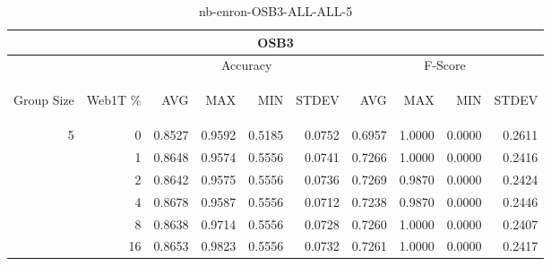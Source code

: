 \begin{center}
\begin{table}[htbp] 
 \begin{center}
\begin{tabular}{ | r | r | r | r | r | r | r | r | r | r |}
\hline
\multicolumn{10}{|c|}{OSB3}\\
\hline
 & & \multicolumn{4}{|c|}{Accuracy} & \multicolumn{4}{|c|}{F-Score}\\ \cline{3-10}
\begin{sideways}Group Size\end{sideways} & \begin{sideways}Web1T \%\end{sideways} & \begin{sideways}AVG\end{sideways} & \begin{sideways}MAX\end{sideways} & \begin{sideways}MIN\end{sideways} & \begin{sideways}STDEV\end{sideways} & \begin{sideways}AVG\end{sideways} & \begin{sideways}MAX\end{sideways} & \begin{sideways}MIN\end{sideways} & \begin{sideways}STDEV\end{sideways}\\
\hline
\multirow{5}{*}{5}
 & 0 & 0.8527 & 0.9592 & 0.5185 & 0.0752 & 0.6957 & 1.0000 & 0.0000 & 0.2611\\ \cline{2-10}
 & 1 & 0.8648 & 0.9574 & 0.5556 & 0.0741 & 0.7266 & 1.0000 & 0.0000 & 0.2416\\ \cline{2-10}
 & 2 & 0.8642 & 0.9575 & 0.5556 & 0.0736 & 0.7269 & 0.9870 & 0.0000 & 0.2424\\ \cline{2-10}
 & 4 & 0.8678 & 0.9587 & 0.5556 & 0.0712 & 0.7238 & 0.9870 & 0.0000 & 0.2446\\ \cline{2-10}
 & 8 & 0.8638 & 0.9714 & 0.5556 & 0.0728 & 0.7260 & 1.0000 & 0.0000 & 0.2407\\ \cline{2-10}
 & 16 & 0.8653 & 0.9823 & 0.5556 & 0.0732 & 0.7261 & 1.0000 & 0.0000 & 0.2417\\ \cline{2-10}
\hline
\end{tabular}
\caption{nb-enron-OSB3-ALL-ALL-5}
\label{table:nb-enron-OSB3-ALL-ALL-5}
\end{center}
 \end{table}
\end{center}

